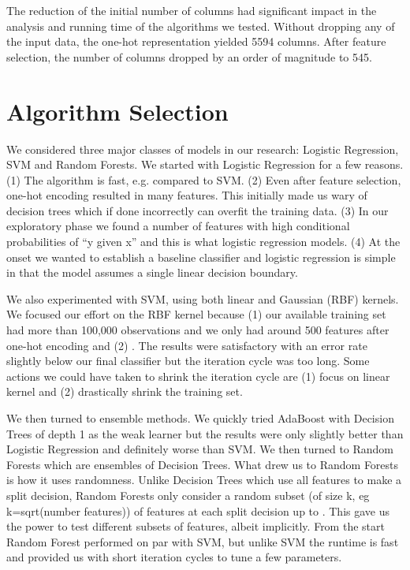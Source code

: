 \documentclass[twoside,11pt]{homework}
\begin{document}
The reduction of the initial number of columns had significant impact in the analysis and running time of the algorithms we tested. Without dropping any of the input data, the one-hot representation yielded 5594 columns. After feature selection, the number of columns dropped by an order of magnitude to 545.  


\section*{Algorithm Selection}



We considered three major classes of models in our research: Logistic Regression,
SVM and Random Forests. We started with Logistic Regression for a few reasons.
(1) The algorithm is fast, e.g. compared to SVM.
(2) Even after feature selection, one-hot encoding resulted in 
many features. This initially made us wary of decision trees which if done 
incorrectly can overfit the training data.
(3) In our exploratory phase we found a number of features with high conditional probabilities of “y given x” and this is what 
logistic regression models.
(4) At the onset we wanted to establish a baseline classifier and logistic regression is simple in that the model assumes a single linear 
decision boundary. 

We also experimented with SVM, using both linear and Gaussian (RBF) kernels. We 
focused our effort on the RBF kernel because (1) our available training set had more 
than 100,000 observations and we only had around 500 features after one-hot 
encoding and (2) . The results were satisfactory with an error rate slightly below 
our final classifier but the iteration cycle was too long. Some actions we could have 
taken to shrink the iteration cycle are (1) focus on linear kernel and (2) drastically 
shrink the training set.

We then turned to ensemble methods. We quickly tried AdaBoost with Decision 
Trees of depth 1 as the weak learner but the results were only slightly better than 
Logistic Regression and definitely worse than SVM. We then turned to Random 
Forests which are ensembles of Decision Trees. What drew us to Random Forests is 
how it uses randomness. Unlike Decision Trees which use all features to make a split 
decision, Random Forests only consider a random subset (of size k, eg 
k=sqrt(number features)) of features at each split decision up to . This gave us the 
power to test different subsets of features, albeit implicitly. From the start Random 
Forest performed on par with SVM, but unlike SVM the runtime is fast and provided 
us with short iteration cycles to tune a few parameters.
\end{document}
